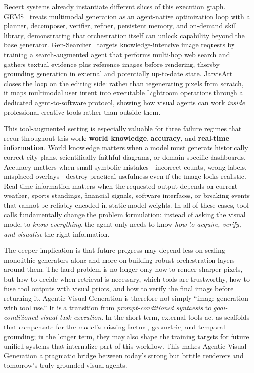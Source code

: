\documentclass{llmxive}
\begin{document}
Recent systems already instantiate different slices of this execution graph. GEMS~\citep{he2026gems} treats multimodal generation as an agent-native optimization loop with a planner, decomposer, verifier, refiner, persistent memory, and on-demand skill library, demonstrating that orchestration itself can unlock capability beyond the base generator. Gen-Searcher~\citep{feng2026gen} targets knowledge-intensive image requests by training a search-augmented agent that performs multi-hop web search and gathers textual evidence plus reference images before rendering, thereby grounding generation in external and potentially up-to-date state. JarvisArt~\citep{lin2025jarvisart} closes the loop on the editing side: rather than regenerating pixels from scratch, it maps multimodal user intent into executable Lightroom operations through a dedicated agent-to-software protocol, showing how visual agents can work \emph{inside} professional creative tools rather than outside them.

This tool-augmented setting is especially valuable for three failure regimes that recur throughout this work: \textbf{world knowledge}, \textbf{accuracy}, and \textbf{real-time information}. World knowledge matters when a model must generate historically correct city plans, scientifically faithful diagrams, or domain-specific dashboards. Accuracy matters when small symbolic mistakes---incorrect counts, wrong labels, misplaced overlays---destroy practical usefulness even if the image looks realistic. Real-time information matters when the requested output depends on current weather, sports standings, financial signals, software interfaces, or breaking events that cannot be reliably encoded in static model weights. In all of these cases, tool calls fundamentally change the problem formulation: instead of asking the visual model to \emph{know everything}, the agent only needs to know \emph{how to acquire, verify, and visualise} the right information.

The deeper implication is that future progress may depend less on scaling monolithic generators alone and more on building robust orchestration layers around them. The hard problem is no longer only how to render sharper pixels, but how to decide when retrieval is necessary, which tools are trustworthy, how to fuse tool outputs with visual priors, and how to verify the final image before returning it. Agentic Visual Generation is therefore not simply ``image generation with tool use.'' It is a transition from \emph{prompt-conditioned synthesis} to \emph{goal-conditioned visual task execution}. In the short term, external tools act as scaffolds that compensate for the model's missing factual, geometric, and temporal grounding; in the longer term, they may also shape the training targets for future unified systems that internalize part of this workflow. This makes Agentic Visual Generation a pragmatic bridge between today's strong but brittle renderers and tomorrow's truly grounded visual agents.
\end{document}
